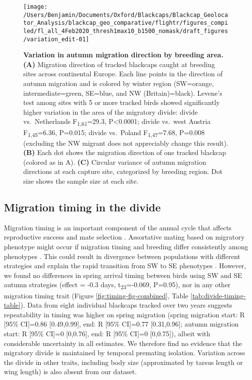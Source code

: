 \documentclass[a4paper, nobind]{templates/ociamthesis}
\begin{document}
\begin{figure}
\texttt{[image: /Users/Benjamin/Documents/Oxford/Blackcaps/Blackcap\_Geolocator\_Analysis/blackcap\_geo\_comparative/flightr/figures\_compiled/fl\_all\_4Feb2020\_thresh1max10\_b1500\_nomask/draft\_figures/variation\_edit-01]} \caption{\textbf{Variation in autumn migration direction by breeding area.} \textbf{(A)} Migration direction of tracked blackcaps caught at breeding sites across continental Europe. Each line points in the direction of autumn migration and is colored by winter region (SW=orange, intermediate=green, SE=blue, and NW (Britain)=black). Levene's test among sites with 5 or more tracked birds showed significantly higher variation in the area of the migratory divide: divide vs.~Netherlands F\textsubscript{1,61}=29.3, P\textless0.0001; divide vs.~west Austria F\textsubscript{1,45}=6.36, P=0.015; divide vs.~Poland F\textsubscript{1,47}=7.68, P=0.008 (excluding the NW migrant does not appreciably change this result). \textbf{(B)} Each dot shows the migration direction of one tracked blackcap (colored as in A). \textbf{(C)} Circular variance of autumn migration directions at each capture site, categorized by breeding region. Dot size shows the sample size at each site.}\label{fig:var-fig-edit}
\end{figure}

\hypertarget{migration-timing-in-the-divide}{%
\subsection{Migration timing in the divide}\label{migration-timing-in-the-divide}}

Migration timing is an important component of the annual cycle that affects reproductive success \autocite{taylorRoleAllochronySpeciation2017,winkerOriginSpeciesHeteropatric2010} and mate selection \autocite{bearhopAssortativeMatingMechanism2005}. Assortative mating based on migratory phenotype might occur if migration timing and breeding differ consistently among phenotypes \autocite{bearhopAssortativeMatingMechanism2005}. This could result in divergence between populations with different strategies and explain the rapid transition from SW to SE phenotypes \autocite{irwinSiberianMigratoryDivides2005}. However, we found no differences in spring arrival timing between birds using SW and SE autumn strategies (effect = -0.3 days, t\textsubscript{23}=-0.069, P=0.95), nor in any other migration timing trait (Figure \ref{fig:timing-fig-combined}, Table \ref{tab:divide-timing-table}). Data from eight individual blackcaps tracked over two years suggests repeatability in timing was higher on spring migration (spring migration start: R {[}95\% CI{]}=0.86 {[}0.49,0.99{]}, end: R {[}95\% CI{]}=0.77 {[}0.31,0.96{]}; autumn migration start: R {[}95\% CI{]}=0 {[}0,0.76{]}, end: R {[}95\% CI{]}=0 {[}0,0.75{]}), albeit with considerable uncertainty in all estimates. We therefore find no evidence that the migratory divide is maintained by temporal premating isolation. Variation across the divide in other traits, including body size (approximated by tarsus length or wing length) is also absent from our dataset.
\end{document}
